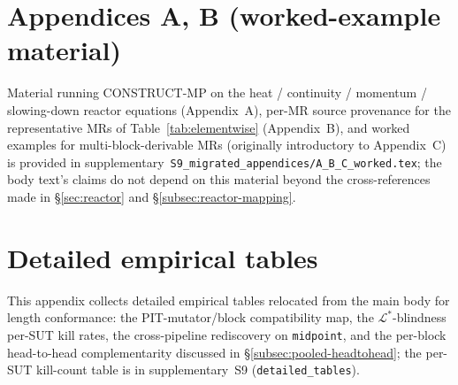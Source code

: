 \documentclass[manuscript]{acmart}
\begin{document}
\clearpage
\appendix

\section*{Appendices A, B (worked-example material)}
\label{app:moved-A-B}
Material running CONSTRUCT-MP on the heat / continuity / momentum / slowing-down reactor equations (Appendix~A), per-MR source provenance for the representative MRs of Table~\ref{tab:elementwise} (Appendix~B), and worked examples for multi-block-derivable MRs (originally introductory to Appendix~C) is provided in supplementary~\texttt{S9\_migrated\_appendices/A\_B\_C\_worked.tex}; the body text's claims do not depend on this material beyond the cross-references made in \S\ref{sec:reactor} and \S\ref{subsec:reactor-mapping}.

\section{Detailed empirical tables}
\label{app:detailed-tables}
This appendix collects detailed empirical tables relocated from the main body for length conformance: the PIT-mutator/block compatibility map, the $\mathcal{L}^{*}$-blindness per-SUT kill rates, the cross-pipeline rediscovery on \texttt{midpoint}, and the per-block head-to-head complementarity discussed in \S\ref{subsec:pooled-headtohead}; the per-SUT kill-count table is in supplementary~S9 (\texttt{detailed\_tables}).
\end{document}
